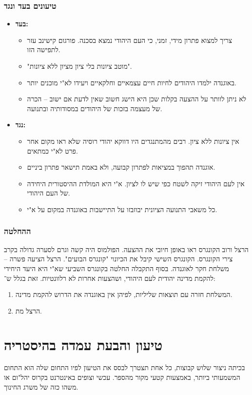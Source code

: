 \documentclass[]{article}
\begin{document}
	\subsubsection{טיעונים בעד ונגד}
	\begin{itemize}
		\item \textbf{בעד: }
		\begin{itemize}
			\item צריך למצוא פתרון מידי, זמני, כי העם היהודי נמצא בסכנה. פורגום קישינב עזר לתפישה הזו. 
			\item "מוטב ציונות בלי ציון מציון ללא ציונות". 
			\item באוגנדה ילמדו היהודים לחיות חיים עצמאיים וחלקאיים ויעידו לא"י מוכנים יותר. 
			\item לא ניתן לוותר על ההצעה בקלות שכן היא הישג חשוב שאין לדעת אם ישוב – הכרה של מעצמה בזכות של היהודים במסודותיה ובתנועה. 
		\end{itemize}
		\item \textbf{נגד: }
		\begin{itemize}
			\item אין ציונות ללא ציון. רבים מהמתנגדים היו דווקא יהודי רוסיה שלא ראו מקום אחר פרט לא"י כמתאים. 
			\item אוגנדה תהפוך במציאות לפתרון קבועה, ולא באמת תישאר פתרון ביניים. 
			\item אין לעם היהודי זיקה לשטח כפי שיש לו לציון. א"י היא המולדת ההיסטורית היחידה של העם היהודי. 
			\item כל משאבי התנועה הציונית יבוזבזו על התיישבות באוגנדה במקום על א"י. 
		\end{itemize}
	\end{itemize}
	
	\subsubsection{ההחלטה}
	הרצל ורוב הקונגרס ראו באופן חיובי את ההצעה. הפולמוס היה קשה וגרם לסערה גדולה בקרב צירי הקונגרס. הקונגרס השישי קיבל את הכיונוי "קונגרס הבועים". הרצל הציעה פשרה – משלחת חקר לאוגנדה. בסוף התקבלה החלטה בקונגרס השביעי שא"י היא היעד היחידי להקמת מדינה יהודית לעם היהודי, ושהצעות אחרות לא רלוונטיות. זאת בגלל ש־: 
	\begin{enumerate}
		\item המשלחת חזרה עם תוצאות שליליות, לפיהן אין באוגנדה את הדרוש להקמת מדינה. 
		\item הרצל מת. 
	\end{enumerate}
	
	
	\section{טיעון והבעת עמדה בהיסטריה}
	בכיתה ניצור שלוש קבוצות, כל אחת תצטרך לבסס את הטיעון לפיו התחום שלה הוא התחום המשמעותי ביותר, באמצעות קטעי מקור מהספר. 
	עכשי וצופים באינטרנט בקרוס יהל"ום או משהו כזה של משרג החינוך. 
	
\end{document}

